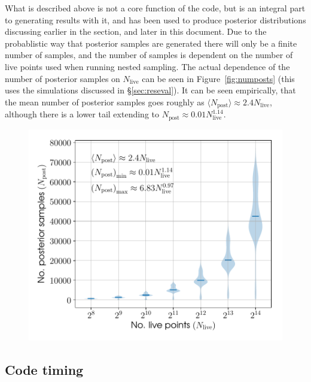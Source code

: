 What is described above is not a core function of the \lppen code, but is an integral part to generating results with it, and has been used to
produce posterior distributions discussing earlier in the section, and later in this document. Due to the probablistic
way that posterior samples are generated there will only be a finite number of samples, and the number of samples is dependent on the number
of live points used when running nested sampling. The actual dependence of the number of posterior samples on $N_{\text{live}}$ can be seen in
Figure~\ref{fig:numposts} (this uses the simulations discussed in \S\ref{sec:reseval}). It can be seen empirically, that the mean number of posterior
samples goes roughly as $\langle N_{\text{post}} \rangle \approx 2.4N_{\text{live}}$, although there is a lower tail extending to $N_{\text{post}} \approx
0.01N_{\text{live}}^{1.14}$.

\begin{figure}[!phtb]
\begin{center}
\includegraphics[width=1\columnwidth]{./figures/codeeval/stats/numposts/numposts}
\caption{ \protect}
\end{center}
\end{figure}

\subsection{Code timing}\label{sec:timing}


